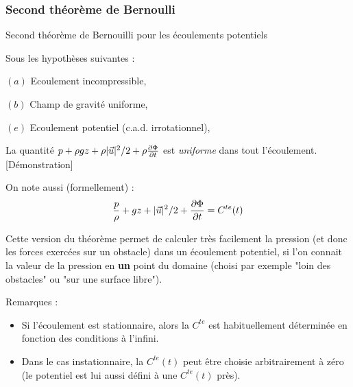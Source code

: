 \subsubsection{Second théorème de Bernoulli}
\begin{frame}{Second théorème de Bernouilli pour les écoulements potentiels} \hypertarget{frame:toto}{}

\small

Sous les hypothèses suivantes :
\medskip

$(a)$ Ecoulement incompressible,
 

$(b)$ Champ de gravité uniforme,


$(e)$ Ecoulement potentiel (c.a.d. irrotationnel),

\medskip

La quantité 
$
p+\rho g z + \rho |\vec{u}|^2/2 +\rho \frac{\partial \Phi}{\partial t}
$
est {\em uniforme} dans tout l'écoulement. {\color{gris}[Démonstration]}

\pause
\medskip

On note aussi (formellement) : 
$$
\frac{p}{\rho} + g z + |\vec{u}|^2/2 + \frac{\partial \Phi}{\partial t} = C^{te}(t)
$$

\bigskip

Cette version du théorème permet de calculer très facilement la pression 
(et donc les forces exercées sur un obstacle) dans un écoulement potentiel, si l'on connait la valeur de la pression en {\bf un} point du domaine (choisi par exemple "loin des obstacles" ou "sur une surface libre").

\pause
\medskip

Remarques : 
\begin{itemize}
\item Si l'écoulement est stationnaire, alors la  $C^{te}$ est habituellement déterminée en fonction des conditions à l'infini.

\item Dans le cas instationnaire, la $C^{te}(t)$ peut être choisie arbitrairement à zéro
(le potentiel est lui aussi défini à une $C^{te}(t)$ près).


\end{itemize}


\vspace{0mm}
\end{frame}



